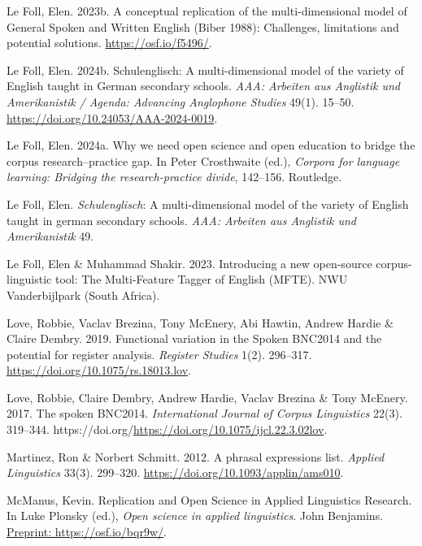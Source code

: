 \documentclass[
  letterpaper,
  DIV=11,
  numbers=noendperiod]{scrreprt}
\newlength{\cslhangindent}
\newenvironment{CSLReferences}[2] %
 {\begin{list}{}{%
  \setlength{\itemindent}{0pt}
  \setlength{\leftmargin}{0pt}
  \setlength{\parsep}{0pt}
  \ifodd #1
   \setlength{\leftmargin}{\cslhangindent}
   \setlength{\itemindent}{-1\cslhangindent}
  \fi
  \setlength{\itemsep}{#2\baselineskip}}}
 {\end{list}}
\begin{document}
\begin{CSLReferences}{1}{0}
Le Foll, Elen. 2023b. A conceptual replication of the multi-dimensional
model of {General} {Spoken} and {Written} {English} ({Biber} 1988):
Challenges, limitations and potential solutions.
\url{https://osf.io/f5496/}.

Le Foll, Elen. 2024b. Schulenglisch: A multi-dimensional model of the
variety of {English} taught in {German} secondary schools. \emph{AAA:
Arbeiten aus Anglistik und Amerikanistik / Agenda: Advancing Anglophone
Studies} 49(1). 15--50. \url{https://doi.org/10.24053/AAA-2024-0019}.

Le Foll, Elen. 2024a. Why we need open science and open education to
bridge the corpus research--practice gap. In Peter Crosthwaite (ed.),
\emph{Corpora for language learning: Bridging the research-practice
divide}, 142--156. Routledge.

Le Foll, Elen. {\emph{Schulenglisch}}: A multi-dimensional model of the
variety of {English} taught in german secondary schools. \emph{AAA:
Arbeiten aus Anglistik und Amerikanistik} 49.

Le Foll, Elen \& Muhammad Shakir. 2023. Introducing a new open-source
corpus-linguistic tool: The {Multi}-{Feature} {Tagger} of {English}
(MFTE). NWU Vanderbijlpark (South Africa).

Love, Robbie, Vaclav Brezina, Tony McEnery, Abi Hawtin, Andrew Hardie \&
Claire Dembry. 2019. Functional variation in the {Spoken} {BNC2014} and
the potential for register analysis. \emph{Register Studies} 1(2).
296--317. \url{https://doi.org/10.1075/rs.18013.lov}.

Love, Robbie, Claire Dembry, Andrew Hardie, Vaclav Brezina \& Tony
McEnery. 2017. The spoken BNC2014. \emph{International Journal of Corpus
Linguistics} 22(3). 319--344.
https://doi.org/\url{https://doi.org/10.1075/ijcl.22.3.02lov}.

Martinez, Ron \& Norbert Schmitt. 2012. A phrasal expressions list.
\emph{Applied Linguistics} 33(3). 299--320.
\url{https://doi.org/10.1093/applin/ams010}.

McManus, Kevin. Replication and {Open} {Science} in {Applied}
{Linguistics} {Research}. In Luke Plonsky (ed.), \emph{Open science in
applied linguistics}. John Benjamins.
\href{Preprint:\%20https://osf.io/bqr9w/}{Preprint:
https://osf.io/bqr9w/}.


\end{CSLReferences}
\end{document}

